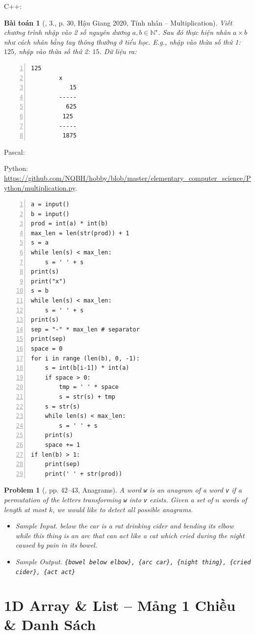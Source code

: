 \documentclass{article}
\newtheorem{baitoan}{Bài toán}
\newtheorem{problem}{Problem}
\begin{document}
C++:

\begin{baitoan}[\cite{VietSTEM2021}, 3., p. 30, Hậu Giang 2020, Tính nhân -- Multiplication]
	Viết chương trình nhập vào 2 số nguyên dương $a,b\in\mathbb{N}^\star$. Sau đó thực hiện nhân $a\times b$ như cách nhân bằng tay thông thường ở tiểu học. E.g., nhập vào thừa số thứ 1: $125$, nhập vào thừa số thứ 2: $15$. {\sf Dữ liệu ra:}
	\begin{Verbatim}[numbers=left,xleftmargin=5mm]
		  125
		x
		   15
		-----
		  625
		 125
		-----
		 1875
	\end{Verbatim}
\end{baitoan}
\noindent Pascal:

Python: \url{https://github.com/NQBH/hobby/blob/master/elementary_computer_science/Python/multiplication.py}.
\begin{Verbatim}[numbers=left,xleftmargin=5mm]
a = input()
b = input()
prod = int(a) * int(b)
max_len = len(str(prod)) + 1
s = a
while len(s) < max_len:
    s = ' ' + s
print(s)
print("x")
s = b
while len(s) < max_len:
    s = ' ' + s
print(s)
sep = "-" * max_len # separator
print(sep)
space = 0
for i in range (len(b), 0, -1):
    s = int(b[i-1]) * int(a)
    if space > 0:
        tmp = ' ' * space
        s = str(s) + tmp
    s = str(s)
    while len(s) < max_len:
        s = ' ' + s
    print(s)
    space += 1
if len(b) > 1:
    print(sep)
    print(' ' + str(prod))
\end{Verbatim}

\begin{problem}[\cite{Durr_Vie2021}, pp. 42--43, Anagrams]
	A word {\tt w} is an \emph{anagram} of a word {\tt v} if a permutation of the letters transforming {\tt w} into {\tt v} exists. Given a set of $n$ words of length at most $k$, we would like to detect all possible anagrams.
	\begin{itemize}
		\item {\sf Sample Input.} below the car is a rat drinking cider and bending its elbow while this thing is an arc that can act like a cat which cried during the night caused by pain in its bowel.
		\item {\sf Sample Output.} \verb|{bowel below elbow}, {arc car}, {night thing}, {cried cider}, {act act}|
	\end{itemize}
\end{problem}


\section{1D Array \& List -- Mảng 1 Chiều \& Danh Sách}
\end{document}

